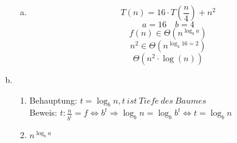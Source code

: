 \documentclass[a4paper,fleqn]{scrartcl}
\begin{document}
\begin{enumerate}[a)]
\begin{enumerate}[(a)]
  \item \[ T(n) = 16 \cdot T\left( \frac{n}{4} \right) + n^2 \]
\[ a= 16 \quad b = 4 \]
\[ f(n) \in \Theta \left( n^{\log_b a} \right) \]
\[ n^2 \in \Theta \left( n^{\log_4 16=2} \right) \]
\[ \Theta \left(n^2 \cdot \log(n)\right) \]
 \end{enumerate}

 \item 
 \begin{enumerate}[1.]
  \item Behauptung: \(t=\log_b n, t\ ist\ Tiefe\ des\ Baumes\) \\
        Beweis: \(t: \frac n {b^t} = f \Leftrightarrow b^t \Rightarrow \log_b n = \log_b b^t \Leftrightarrow t=\log_b n\)
  \item $ n^{\log_b a} $
 \end{enumerate}

\end{enumerate}
 
\end{document}
